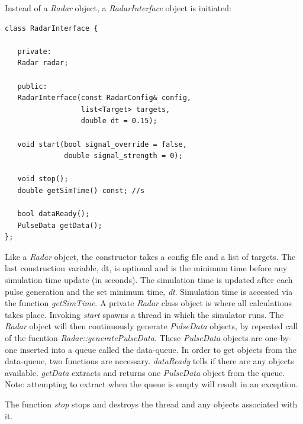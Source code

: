 \documentclass[letterpaper]{book}
\begin{document}
Instead of a \textit{Radar} object, a \textit{RadarInterface} object is initiated:
\begin{lstlisting}
class RadarInterface {

   private:
   Radar radar;

   public:
   RadarInterface(const RadarConfig& config, 
                  list<Target> targets, 
                  double dt = 0.15);

   void start(bool signal_override = false, 
              double signal_strength = 0);

   void stop();    
   double getSimTime() const; //s

   bool dataReady();
   PulseData getData();
};
\end{lstlisting}
Like a \textit{Radar} object, the constructor takes a config file and a list of targets. The last construction variable, dt, is optional and is the minimum time before any simulation time update (in seconds). The simulation time is updated after each pulse generation and the set minimum time, \textit{dt}. Simulation time is accessed via the function \textit{getSimTime}. A private \textit{Radar} class object is where all calculations takes place. Invoking \textit{start} spawns a thread in which the simulator runs. The \textit{Radar} object will then continuously generate \textit{PulseData} objects, by repeated call of the fucntion \textit{Radar::generatePulseData}. These \textit{PulseData} objects are one-by-one inserted into a queue called the data-queue. In order to get objects from the data-queue, two functions are necessary. \textit{dataReady} tells if there are any objects available. \textit{getData} extracts and returns one \textit{PulseData} object from the queue. Note: attempting to extract when the queue is empty will result in an exception.  

The function \textit{stop} stops and destroys the thread and any objects associated with it.
 
\end{document}
